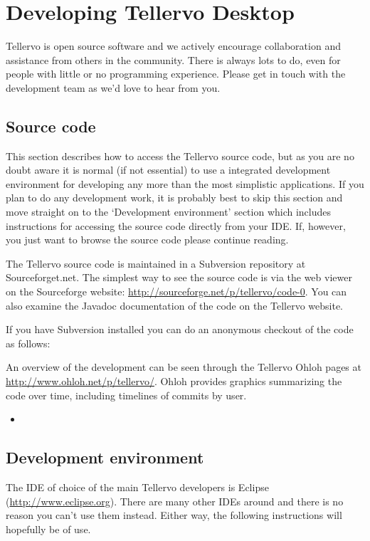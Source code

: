 \chapter{Developing Tellervo Desktop}
\label{txt:devDesktop}
Tellervo is open source software and we actively encourage collaboration and assistance from others in the community.  There is always lots to do, even for people with little or no programming experience.  Please get in touch with the development team as we'd love to hear from you.

\section{Source code}
This section describes how to access the Tellervo source code, but as you are no doubt aware it is normal (if not essential) to use a integrated development environment for developing any more than the most simplistic applications.  If you plan to do any development work, it is probably best to skip this section and move straight on to the `Development environment' section which includes instructions for accessing the source code directly from your IDE.  If, however, you just want to browse the source code please continue reading.

The Tellervo source code is maintained in a Subversion repository at Sourceforget.net.  The simplest way to see the source code is via the web viewer on the Sourceforge website: \url{http://sourceforge.net/p/tellervo/code-0}.  You can also examine the Javadoc documentation of the code on the Tellervo website.

If you have Subversion installed you can do an anonymous checkout of the code as follows:


An overview of the development can be seen through the Tellervo Ohloh pages at \url{http://www.ohloh.net/p/tellervo/}.  Ohloh provides graphics summarizing the code over time, including timelines of commits by user.

\begin{itemize}
 \item 
\end{itemize}


\section{Development environment}
The IDE of choice of the main Tellervo developers is Eclipse (\url{http://www.eclipse.org}). There are many other IDEs around and there is no reason you can't use them instead.  Either way, the following instructions will hopefully be of use.

